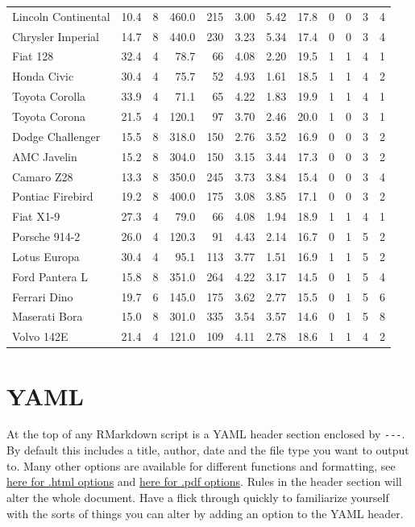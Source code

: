 \documentclass[]{book}
\theoremstyle{definition}
\theoremstyle{definition}
\theoremstyle{definition}
\theoremstyle{remark}
\begin{document}
\begin{longtable}[t]{lrrrrrrrrrrr}
\addlinespace
Lincoln Continental & 10.4 & 8 & 460.0 & 215 & 3.00 & 5.42 & 17.8 & 0 & 0 & 3 & 4\\
Chrysler Imperial & 14.7 & 8 & 440.0 & 230 & 3.23 & 5.34 & 17.4 & 0 & 0 & 3 & 4\\
Fiat 128 & 32.4 & 4 & 78.7 & 66 & 4.08 & 2.20 & 19.5 & 1 & 1 & 4 & 1\\
Honda Civic & 30.4 & 4 & 75.7 & 52 & 4.93 & 1.61 & 18.5 & 1 & 1 & 4 & 2\\
Toyota Corolla & 33.9 & 4 & 71.1 & 65 & 4.22 & 1.83 & 19.9 & 1 & 1 & 4 & 1\\
\addlinespace
Toyota Corona & 21.5 & 4 & 120.1 & 97 & 3.70 & 2.46 & 20.0 & 1 & 0 & 3 & 1\\
Dodge Challenger & 15.5 & 8 & 318.0 & 150 & 2.76 & 3.52 & 16.9 & 0 & 0 & 3 & 2\\
AMC Javelin & 15.2 & 8 & 304.0 & 150 & 3.15 & 3.44 & 17.3 & 0 & 0 & 3 & 2\\
Camaro Z28 & 13.3 & 8 & 350.0 & 245 & 3.73 & 3.84 & 15.4 & 0 & 0 & 3 & 4\\
Pontiac Firebird & 19.2 & 8 & 400.0 & 175 & 3.08 & 3.85 & 17.1 & 0 & 0 & 3 & 2\\
\addlinespace
Fiat X1-9 & 27.3 & 4 & 79.0 & 66 & 4.08 & 1.94 & 18.9 & 1 & 1 & 4 & 1\\
Porsche 914-2 & 26.0 & 4 & 120.3 & 91 & 4.43 & 2.14 & 16.7 & 0 & 1 & 5 & 2\\
Lotus Europa & 30.4 & 4 & 95.1 & 113 & 3.77 & 1.51 & 16.9 & 1 & 1 & 5 & 2\\
Ford Pantera L & 15.8 & 8 & 351.0 & 264 & 4.22 & 3.17 & 14.5 & 0 & 1 & 5 & 4\\
Ferrari Dino & 19.7 & 6 & 145.0 & 175 & 3.62 & 2.77 & 15.5 & 0 & 1 & 5 & 6\\
\addlinespace
Maserati Bora & 15.0 & 8 & 301.0 & 335 & 3.54 & 3.57 & 14.6 & 0 & 1 & 5 & 8\\
Volvo 142E & 21.4 & 4 & 121.0 & 109 & 4.11 & 2.78 & 18.6 & 1 & 1 & 4 & 2\\*
\end{longtable}

\hypertarget{yaml}{%
\section{YAML}\label{yaml}}

At the top of any RMarkdown script is a YAML header section enclosed by
\texttt{-\/-\/-}. By default this includes a title, author, date and the
file type you want to output to. Many other options are available for
different functions and formatting, see
\href{https://bookdown.org/yihui/rmarkdown/html-document.html}{here for
.html options} and
\href{https://bookdown.org/yihui/rmarkdown/pdf-document.html}{here for
.pdf options}. Rules in the header section will alter the whole
document. Have a flick through quickly to familiarize yourself with the
sorts of things you can alter by adding an option to the YAML header.
\end{document}
